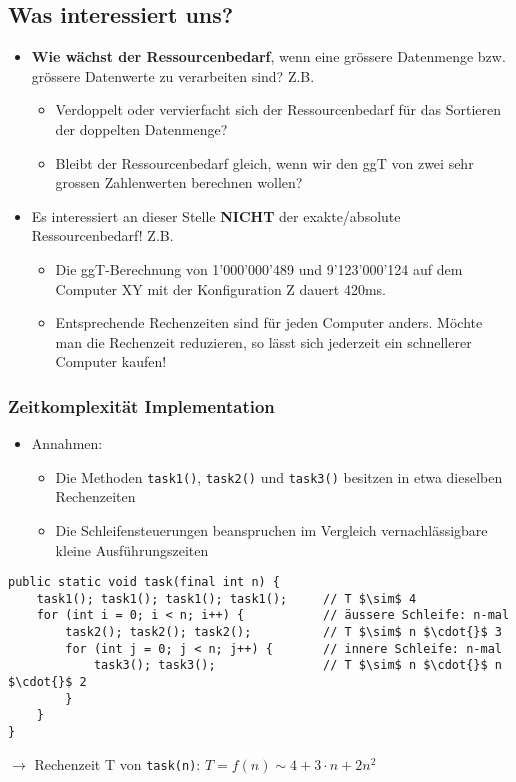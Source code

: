 \subsection*{Was interessiert uns?}
\begin{itemize}
    \item \textbf{Wie wächst der Ressourcenbedarf}, wenn eine grössere Datenmenge bzw. grössere Datenwerte zu verarbeiten sind? Z.B.
    \begin{itemize}
        \item Verdoppelt oder vervierfacht sich der Ressourcenbedarf für das Sortieren der doppelten Datenmenge?
        \item Bleibt der Ressourcenbedarf gleich, wenn wir den ggT von zwei sehr grossen Zahlenwerten berechnen wollen?
    \end{itemize}
    \item Es interessiert an dieser Stelle \textbf{NICHT} der exakte/absolute Ressourcenbedarf! Z.B.
    \begin{itemize}
        \item Die ggT-Berechnung von 1'000'000'489 und 9'123'000'124 auf dem Computer XY mit der Konfiguration Z dauert 420ms.
        \item Entsprechende Rechenzeiten sind für jeden Computer anders. Möchte man die Rechenzeit reduzieren, so lässt sich jederzeit ein schnellerer Computer kaufen!
    \end{itemize}
\end{itemize}

\subsubsection{Zeitkomplexität Implementation}
\begin{itemize}
    \item Annahmen:
    \begin{itemize}
        \item Die Methoden \texttt{task1()}, \texttt{task2()} und \texttt{task3()} besitzen in etwa dieselben Rechenzeiten
        \item Die Schleifensteuerungen beanspruchen im Vergleich vernachlässigbare kleine Ausführungszeiten
    \end{itemize}
\end{itemize}

\lstset{language=Java}
\begin{lstlisting}[mathescape]
public static void task(final int n) {
    task1(); task1(); task1(); task1();     // T $\sim$ 4
    for (int i = 0; i < n; i++) {           // äussere Schleife: n-mal
        task2(); task2(); task2();          // T $\sim$ n $\cdot{}$ 3
        for (int j = 0; j < n; j++) {       // innere Schleife: n-mal
            task3(); task3();               // T $\sim$ n $\cdot{}$ n $\cdot{}$ 2
        }
    }
}
\end{lstlisting}
$\rightarrow$ Rechenzeit T von \texttt{task(n)}: $T=f(n)\sim 4+3\cdot n+2n^2$

